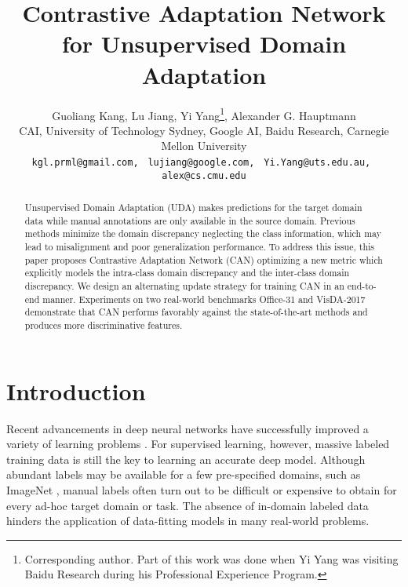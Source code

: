 \documentclass[10pt,twocolumn,letterpaper]{article}
\begin{document}
\title{Contrastive Adaptation Network for Unsupervised Domain Adaptation}

\author{Guoliang Kang, Lu Jiang, 
Yi Yang\thanks{
Corresponding author. Part of this work was done when Yi Yang was visiting Baidu Research during his Professional Experience Program.}, 
Alexander G. Hauptmann\\
CAI, University of Technology Sydney, 
Google AI, 
Baidu Research, 
Carnegie Mellon University
\\
{\tt\small kgl.prml@gmail.com, }
{\tt\small lujiang@google.com, }
{\tt\small Yi.Yang@uts.edu.au, }
{\tt\small alex@cs.cmu.edu}
}

\newcommand{\lu}[1]{{\color{red}{(lu: #1)}}}
\newcommand{\kang}[1]{{\color{blue}{(kang: #1)}}}


\newcommand{\x}{\boldsymbol{x}}
\newcommand{\X}{\boldsymbol{X}}
\newcommand{\ibf}[1]{\textit{\textbf{#1}}}
\newcommand{\pl}{\phi_l}
\newcommand{\kl}{k_l}
\newcommand{\De}{\hat{\mathcal{D}}}
\newcommand{\D}{\mathcal{D}}

\maketitle


\begin{abstract}
Unsupervised Domain Adaptation (UDA) makes predictions for the target domain data while manual annotations are only available in the source domain. Previous methods minimize the domain discrepancy neglecting the class information, which may lead to misalignment and poor generalization performance. To address this issue, this paper proposes Contrastive Adaptation Network (CAN) optimizing a new metric which explicitly models the intra-class domain discrepancy and the inter-class domain discrepancy. We design an alternating update strategy for training CAN in an end-to-end manner. Experiments on two real-world benchmarks Office-31 and VisDA-2017 demonstrate that CAN performs favorably against the state-of-the-art methods and produces more discriminative features.
\end{abstract}

\section{Introduction}
Recent advancements in deep neural networks have successfully improved a variety of learning problems \cite{zhu2017bidirectional,dong2019search,Yawei2019Taking,jiang2014easy,kang2018shakeout}. For supervised learning, however, massive labeled training data is still the key to learning an accurate deep model. Although abundant labels may be available for a few pre-specified domains, such as ImageNet \cite{deng2009imagenet}, manual labels often turn out to be difficult or expensive to obtain for every ad-hoc target domain or task. The absence of in-domain labeled data hinders the application of data-fitting models in many real-world problems.
\end{document}
